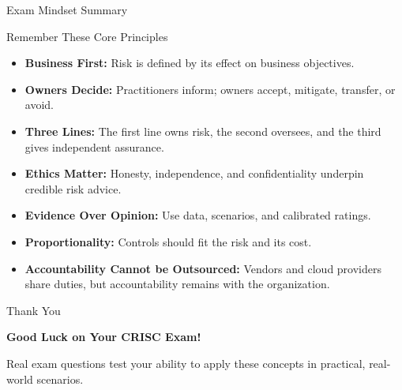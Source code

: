 \documentclass[aspectratio=169]{beamer}
\begin{document}
	\begin{frame}{Exam Mindset Summary}
		\begin{block}{Remember These Core Principles}
			\begin{itemize}
				\item \textbf{Business First:} Risk is defined by its effect on business objectives.
				\item \textbf{Owners Decide:} Practitioners inform; owners accept, mitigate, transfer, or avoid.
				\item \textbf{Three Lines:} The first line owns risk, the second oversees, and the third gives independent assurance.
				\item \textbf{Ethics Matter:} Honesty, independence, and confidentiality underpin credible risk advice.
				\item \textbf{Evidence Over Opinion:} Use data, scenarios, and calibrated ratings.
				\item \textbf{Proportionality:} Controls should fit the risk and its cost.
				\item \textbf{Accountability Cannot be Outsourced:} Vendors and cloud providers share duties, but accountability remains with the organization.
			\end{itemize}
		\end{block}
	\end{frame}

	\begin{frame}{Thank You}
		\begin{center}
			{\Huge \textbf{Good Luck on Your CRISC Exam!}}

			\vspace{1cm}

			\normalsize
			Real exam questions test your ability to apply these concepts in practical, real-world scenarios.
		\end{center}
	\end{frame}
\end{document}
